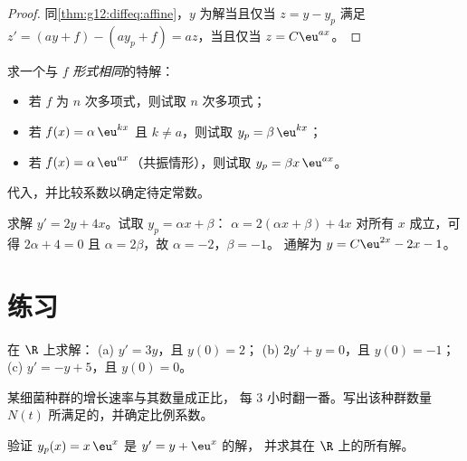 \begin{proof}
同\cref{thm:g12:diffeq:affine}，$y$ 为解当且仅当
$z = y - y_p$ 满足
$z' = (ay + f) - (ay_p + f) = az$，当且仅当 $z = C\eu^{ax}$。
\end{proof}

\begin{method}[猜测特解]\label{met:g12:diffeq:particular}
求一个与 $f$ \emph{形式相同}的特解：
\begin{itemize}
  \item 若 $f$ 为 $n$ 次多项式，则试取 $n$ 次多项式；
  \item 若 $f(x) = \alpha\,\eu^{kx}$ 且 $k \neq a$，则试取 $y_p = \beta\,\eu^{kx}$；
  \item 若 $f(x) = \alpha\,\eu^{ax}$（共振情形），则试取
        $y_p = \beta x\,\eu^{ax}$。
\end{itemize}
代入，并比较系数以确定待定常数。
\end{method}

\begin{example}\label{ex:g12:diffeq:particular}
求解 $y' = 2y + 4x$。试取 $y_p = \alpha x + \beta$：
$\alpha = 2(\alpha x + \beta) + 4x$ 对所有 $x$ 成立，可得
$2\alpha + 4 = 0$ 且 $\alpha = 2\beta$，故 $\alpha = -2$，$\beta = -1$。
通解为 $y = C\eu^{2x} - 2x - 1$。
\end{example}

\section{练习}

\begin{exercise}[$\star$]\label{exo:g12:diffeq:1}
在 $\R$ 上求解：
(a) $y' = 3y$，且 $y(0) = 2$；\quad
(b) $2y' + y = 0$，且 $y(0) = -1$；\quad
(c) $y' = -y + 5$，且 $y(0) = 0$。
\end{exercise}

\begin{exercise}[$\star$]\label{exo:g12:diffeq:2}
某细菌种群的增长速率与其数量成正比，
每 $3$ 小时翻一番。写出该种群数量
$N(t)$ 所满足的，并确定比例系数。
\end{exercise}

\begin{exercise}[$\star$]\label{exo:g12:diffeq:3}
验证 $y_p(x) = x\,\eu^{x}$ 是 $y' = y + \eu^x$ 的解，
并求其在 $\R$ 上的所有解。
\end{exercise}

